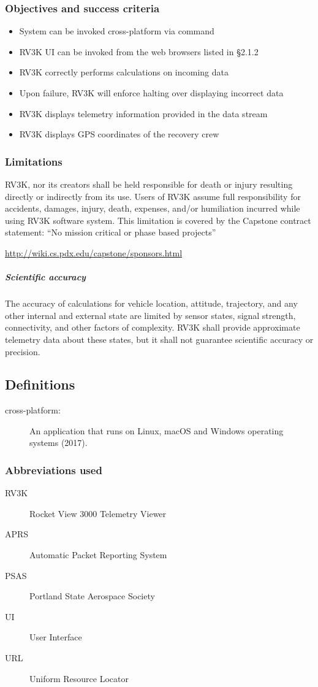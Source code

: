 \subsubsection{Objectives and success criteria}
  \begin{itemize}
    \item System can be invoked cross-platform via command
    \item RV3K UI can be invoked from the web browsers listed in \S 2.1.2
    \item RV3K correctly performs calculations on incoming data
    \item Upon failure, RV3K will enforce halting over displaying incorrect data 
    \item RV3K displays telemetry information provided in the data stream
    \item RV3K displays GPS coordinates of the recovery crew
  \end{itemize}

\subsubsection{Limitations}
  RV3K, nor its creators shall be held responsible for death or injury resulting
  directly or indirectly from its use. Users of RV3K assume full responsibility
  for accidents, damages, injury, death, expenses, and/or humiliation incurred
  while using RV3K software system. This limitation is covered by the Capstone
  contract statement: ``No mission critical or phase based projects''

  \url{http://wiki.cs.pdx.edu/capstone/sponsors.html}

  \medskip

  \subparagraph{Scientific accuracy}
    The accuracy of calculations for vehicle location, attitude, trajectory, and
    any other internal and external state are limited by sensor states, signal strength,
    connectivity, and other factors of complexity. RV3K shall provide approximate telemetry data
    about these states, but it shall not guarantee scientific accuracy or precision.



\subsection{Definitions}
\begin{description}
  \item[cross-platform:] An application that runs on Linux, macOS and Windows operating systems (2017).
\end{description}

\subsubsection{Abbreviations used}

\begin{description}
  \item[RV3K] Rocket View 3000 \vers Telemetry Viewer
  \item[APRS] Automatic Packet Reporting System
  \item[PSAS] Portland State Aerospace Society
  \item[UI]   User Interface
  \item[URL]  Uniform Resource Locator
\end{description}
